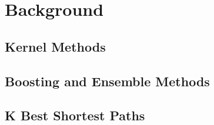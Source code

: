 \chapter{Background}
\section{Kernel Methods}
\section{Boosting and Ensemble Methods}
\section{K Best Shortest Paths}
